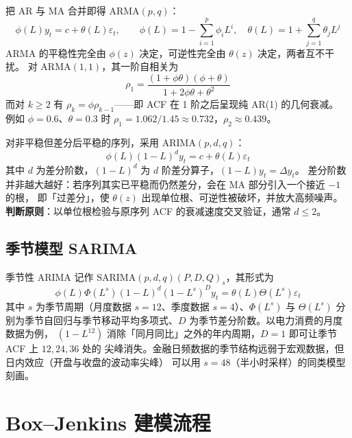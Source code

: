 把 AR 与 MA 合并即得 $\mathrm{ARMA}(p,q)$：
\begin{equation}\label{eq:09-arma}
  \phi(L)y_t=c+\theta(L)\varepsilon_t,\qquad
  \phi(L)=1-\sum_{i=1}^{p}\phi_iL^i,\quad
  \theta(L)=1+\sum_{j=1}^{q}\theta_jL^j
\end{equation}
ARMA 的平稳性完全由 $\phi(z)$ 决定，可逆性完全由 $\theta(z)$ 决定，两者互不干扰。
对 $\mathrm{ARMA}(1,1)$，其一阶自相关为
\begin{equation}\label{eq:09-arma1-acf}
  \rho_1=\frac{(1+\phi\theta)(\phi+\theta)}{1+2\phi\theta+\theta^{2}}
\end{equation}
而对 $k\ge 2$ 有 $\rho_k=\phi\rho_{k-1}$——即 ACF 在 1 阶之后呈现纯 AR(1) 的几何衰减。
例如 $\phi=0.6$、$\theta=0.3$ 时 $\rho_1=1.062/1.45\approx 0.732$，$\rho_2\approx 0.439$。

对非平稳但差分后平稳的序列，采用 $\mathrm{ARIMA}(p,d,q)$：
\begin{equation}\label{eq:09-arima}
  \phi(L)(1-L)^{d}y_t=c+\theta(L)\varepsilon_t
\end{equation}
其中 $d$ 为差分阶数，$(1-L)^d$ 为 $d$ 阶差分算子，$(1-L)y_t=\Delta y_t$。
差分阶数并非越大越好：若序列其实已平稳而仍然差分，会在 MA 部分引入一个接近 $-1$ 的根，
即「过差分」，使 $\theta(z)$ 出现单位根、可逆性被破坏，并放大高频噪声。
\textbf{判断原则}：以单位根检验与原序列 ACF 的衰减速度交叉验证，通常 $d\le 2$。

\subsection{季节模型 SARIMA}

季节性 ARIMA 记作 $\mathrm{SARIMA}(p,d,q)(P,D,Q)_s$，其形式为
\begin{equation}\label{eq:09-sarima}
  \phi(L)\Phi(L^{s})(1-L)^{d}(1-L^{s})^{D}y_t=\theta(L)\Theta(L^{s})\varepsilon_t
\end{equation}
其中 $s$ 为季节周期（月度数据 $s=12$、季度数据 $s=4$）、$\Phi(L^s)$ 与 $\Theta(L^s)$
分别为季节自回归与季节移动平均多项式、$D$ 为季节差分阶数。以电力消费的月度数据为例，
$(1-L^{12})$ 消除「同月同比」之外的年内周期，$D=1$ 即可让季节 ACF 上 $12,24,36$ 处的
尖峰消失。金融日频数据的季节结构远弱于宏观数据，但日内效应（开盘与收盘的波动率尖峰）
可以用 $s=48$（半小时采样）的同类模型刻画。

\section{Box--Jenkins 建模流程}

